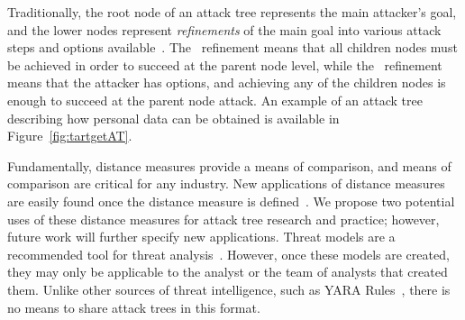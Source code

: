 \begin{definition}
\end{definition}

Traditionally, the root node of an attack tree represents the main attacker's goal, and the lower nodes represent \emph{refinements} of the main goal into various attack steps and options available~\cite{mauwFoundationsAttackTrees2006}. The \AND\ refinement means that all children nodes must be achieved in order to succeed at the parent node level, while the \OR\ refinement means that the attacker has options, and achieving any of the children nodes is enough to succeed at the parent node attack. An example of an attack tree describing how personal data can be obtained is available in Figure~\ref{fig:tartgetAT}.

Fundamentally, distance measures provide a means of comparison, and means of comparison are critical for any industry. New applications of distance measures are easily found once the distance measure is defined~\cite{beham2011new}. We propose two potential uses of these distance measures for attack tree research and practice; however, future work will further specify new applications. Threat models are a recommended tool for threat analysis~\cite{andersonSecurityEngineeringGuide2020,schneierSecretsLiesDigital2000}. However, once these models are created, they may only be applicable to the analyst or the team of analysts that created them. Unlike other sources of threat intelligence, such as YARA Rules~\cite{naik2019cyberthreat,naik2020evaluating}, there is no means to share attack trees in this format.

